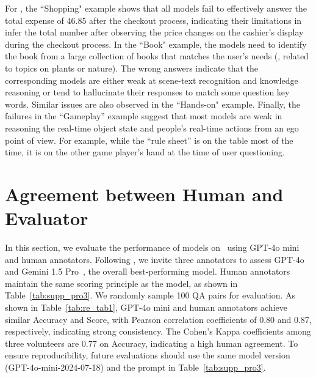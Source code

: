 For \textbf{\datasetin}, the ``Shopping" example shows that all models fail to effectively answer the total expense of 46.85 after the checkout process, indicating their
limitations in infer the total number after observing the price changes on the cashier's display during the checkout process. 
In the ``Book" example, the models need to identify the book from a large collection of books that matches the user’s needs (\eg, related to topics on plants or nature). The wrong answers indicate that the corresponding models are either weak at scene-text recognition and knowledge reasoning or tend to hallucinate their responses to match some question key words. Similar issues are also observed in the ``Hands-on" example.
Finally, the failures in the ``Gameplay'' example suggest that most models are weak in reasoning the real-time object state and people's real-time actions from an ego point of view. For example, while the ``rule sheet'' is on the table most of the time, it is on the other game player's hand at the time of user questioning.



\section{Agreement between Human and Evaluator}
\label{sup:agreement}
In this section, we evaluate the performance of models on \datasetout~using GPT-4o mini~\cite{gpt4omini2024} and human annotators. Following \cite{cheng2024egothink}, we invite three annotators to assess GPT-4o~\cite{achiam2023gpt} and Gemini 1.5 Pro~\cite{reid2024gemini}, the overall best-performing model. Human annotators maintain the same scoring principle as the model, as shown in Table~\ref{tab:supp_pro3}. We randomly sample 100 QA pairs for evaluation. As shown in Table~\ref{tab:re_tab1}, GPT-4o mini and human annotators achieve similar Accuracy and Score, with Pearson correlation coefficients of 0.80 and 0.87, respectively, indicating strong consistency. The Cohen's Kappa coefficients among three volunteers are 0.77 on Accuracy, indicating a high human agreement. 
To ensure reproducibility, future evaluations should use the same model version (GPT-4o-mini-2024-07-18) and the prompt in Table~\ref{tab:supp_pro3}.


